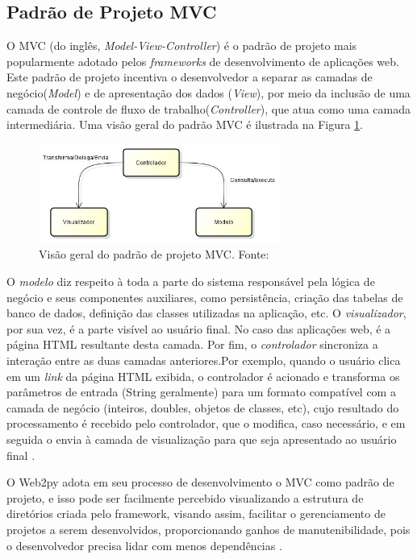 \subsection{Padrão de Projeto MVC}

O MVC (do inglês, \emph{Model-View-Controller}) é o padrão de projeto mais popularmente adotado pelos \emph{frameworks} de desenvolvimento de aplicações web. Este padrão de projeto incentiva o desenvolvedor a separar as camadas de negócio(\emph{Model}) e de apresentação dos dados (\emph{View}), por meio da inclusão de uma camada de controle de fluxo de trabalho(\emph{Controller}), que atua como uma camada intermediária\cite{Pierro:Livro}. Uma visão geral do padrão MVC é ilustrada na Figura \ref{fig:padraomvc}.

\begin{figure}[H]
	\centering
	\includegraphics[width=0.7\textwidth]{./img/mvc.png}
	\caption{Visão geral do padrão de projeto MVC. Fonte: \cite{Weissman:MVC} \label{fig:padraomvc}}
\end{figure}

O \textit{modelo} diz respeito à toda a parte do sistema responsável pela lógica de negócio e seus componentes auxiliares, como persistência, criação das tabelas de banco de dados, definição das classes utilizadas na aplicação, etc. O \textit{visualizador}, por sua vez, é a parte visível ao usuário final. No caso das aplicações web, é a página HTML resultante desta camada. Por fim, o \emph{controlador} sincroniza a interação entre as duas camadas anteriores.Por exemplo, quando o usuário clica em um \textit{link} da página HTML exibida, o controlador é acionado e transforma os parâmetros de entrada (String geralmente) para um formato compatível com a camada de negócio (inteiros, doubles, objetos de classes, etc), cujo resultado do  processamento é recebido pelo controlador, que o modifica, caso necessário, e em seguida o envia à camada de visualização para que seja apresentado ao usuário final \cite{Weissman:MVC}.

O Web2py adota em seu processo de desenvolvimento o MVC como padrão de projeto, e isso pode ser facilmente percebido visualizando a estrutura de diretórios criada pelo framework, visando assim, facilitar o gerenciamento de projetos a serem desenvolvidos, proporcionando ganhos de manutenibilidade, pois o desenvolvedor precisa lidar com menos dependências \cite{Pierro:Livro}.